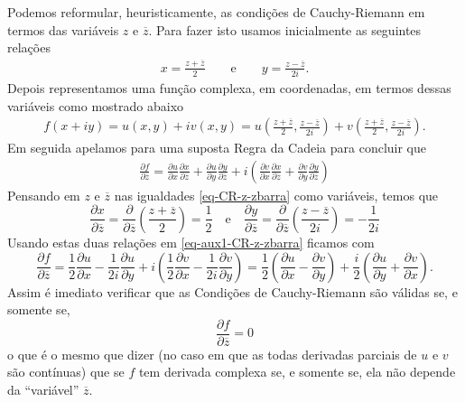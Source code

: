 Podemos reformular, heuristicamente, as condições de Cauchy-Riemann em termos das variáveis $z$ e $\overline{z}$.
Para fazer isto usamos inicialmente as seguintes relações
\begin{align}\label{eq-CR-z-zbarra}
x = \frac{z+\overline{z}}{2}
\qquad\text{e}\qquad 
y=\frac{z-\overline{z}}{2i}.
\end{align}
Depois representamos uma função complexa, em coordenadas, em termos dessas variáveis como
mostrado abaixo
\begin{align*}
f(x+iy) = u(x,y)+iv(x,y) 
= 
u\left( \frac{z+\overline{z}}{2},\frac{z-\overline{z}}{2i} \right) 
+
v\left( \frac{z+\overline{z}}{2},\frac{z-\overline{z}}{2i} \right).
\end{align*}
Em seguida apelamos para uma suposta  Regra da Cadeia para concluir que 
\begin{align}\label{eq-aux1-CR-z-zbarra}
\frac{\partial f}{\partial \overline{z}}
=
\frac{\partial u}{\partial x}
\frac{\partial x}{\partial \overline{z}}
+
\frac{\partial u}{\partial y}
\frac{\partial y}{\partial \overline{z}}
+i
\left(
\frac{\partial v}{\partial x}
\frac{\partial x}{\partial \overline{z}}
+
\frac{\partial v}{\partial y}
\frac{\partial y}{\partial \overline{z}}
\right)
\end{align}
Pensando em $z$ e $\overline{z}$ nas igualdades \eqref{eq-CR-z-zbarra} como variáveis, temos que
\[
\frac{\partial x}{\partial \overline{z}} = \frac{\partial }{\partial \overline{z}}\left( \frac{z+\overline{z}}{2} \right) = \frac{1}{2}
\quad\text{e}\quad
\frac{\partial y}{\partial \overline{z}} = \frac{\partial }{\partial \overline{z}}\left( \frac{z-\overline{z}}{2i} \right)=-\frac{1}{2i}
\]
Usando estas duas relações em \eqref{eq-aux1-CR-z-zbarra} ficamos com
\[
\frac{\partial f}{\partial \overline{z}}
=
\frac{1}{2}
\frac{\partial u}{\partial x}
-
\frac{1}{2i}
\frac{\partial u}{\partial y}
+i
\left(
\frac{1}{2}
\frac{\partial v}{\partial x}
-
\frac{1}{2i}
\frac{\partial v}{\partial y}
\right)
=
\frac{1}{2} \left( \frac{\partial u}{\partial x}-\frac{\partial v}{\partial y} \right)
+
\frac{i}{2} \left( \frac{\partial u}{\partial y}+\frac{\partial v}{\partial x} \right).
\]
Assim é imediato verificar que as Condições de Cauchy-Riemann são válidas se, e somente se,
\[
\frac{\partial f}{\partial \overline{z}} = 0
\]
o que é o mesmo que dizer (no caso em que as todas derivadas parciais de $u$ e $v$ são contínuas) 
que se $f$ tem derivada complexa se, e somente se, ela não depende 
da ``variável'' $\overline{z}$.

\bigskip 

